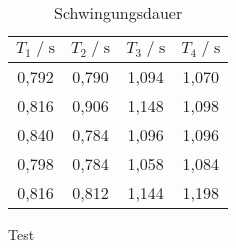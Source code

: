 \begin{table}
    \centering
        \caption{Schwingungsdauer}
        \label{tab:schwingdauer}
        \begin{tabular}{c c c c}
        \toprule
        $T_1 \;/\; \si{\second}$ & $T_2 \;/\; \si{\second}$ & $T_3 \;/\; \si{\second}$ & $T_4 \;/\; \si{\second}$ \\
        \midrule
        0,792 & 0,790 & 1,094 & 1,070 \\
        0,816 & 0,906 & 1,148 & 1,098 \\
        0,840 & 0,784 & 1,096 & 1,096 \\
        0,798 & 0,784 & 1,058 & 1,084 \\
        0,816 & 0,812 & 1,144 & 1,198 \\
        \bottomrule
    \end{tabular}
\end{table}

Test \cite{Anleitung}